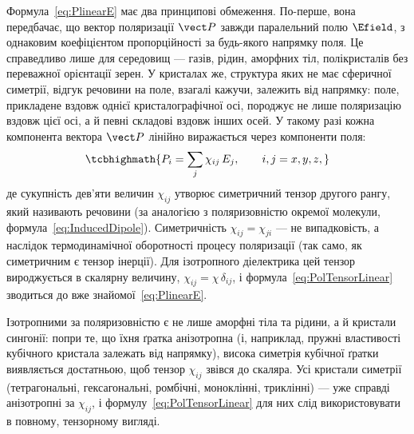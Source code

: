 Формула~\eqref{eq:PlinearE} має два принципові обмеження. По-перше, вона передбачає, що вектор поляризації $\vect P$ завжди паралельний полю
$\Efield$, з однаковим коефіцієнтом пропорційності за будь-якого напрямку поля. Це справедливо лише для  середовищ --- газів,
рідин, аморфних тіл, полікристалів без переважної орієнтації зерен. У кристалах же, структура яких не має сферичної симетрії, відгук речовини на
поле, взагалі кажучи, залежить від напрямку: поле, прикладене вздовж однієї кристалографічної осі, породжує не лише поляризацію вздовж цієї осі, а
й певні складові вздовж інших осей. У такому разі кожна компонента вектора $\vect P$ лінійно виражається через  компоненти поля:
\begin{equation}\label{eq:PolTensorLinear}
	\tcbhighmath{
		P_i = \sum_j \chi_{ij}\, E_j, \qquad i,j = x,y,z,
	}
\end{equation}
де сукупність дев'яти величин $\chi_{ij}$ утворює симетричний тензор другого рангу, який називають  речовини (за
аналогією з поляризовністю окремої молекули, формула~\eqref{eq:InducedDipole}). Симетричність $\chi_{ij}=\chi_{ji}$ --- не випадковість, а наслідок
термодинамічної оборотності процесу поляризації (так само, як симетричним є тензор інерції). Для ізотропного діелектрика цей тензор вироджується в
скалярну величину, $\chi_{ij} = \chi\,\delta_{ij}$, і формула~\eqref{eq:PolTensorLinear} зводиться до вже знайомої~\eqref{eq:PlinearE}.

\begin{Attention}
	Ізотропними за поляризовністю є не лише аморфні тіла та рідини, а й кристали  сингонії: попри те, що їхня ґратка анізотропна (і,
	наприклад, пружні властивості кубічного кристала залежать від напрямку), висока симетрія кубічної ґратки виявляється достатньою, щоб тензор
	$\chi_{ij}$ звівся до скаляра. Усі кристали  симетрії (тетрагональні, гексагональні, ромбічні, моноклінні, триклінні) --- уже
	справді анізотропні за $\chi_{ij}$, і формулу~\eqref{eq:PolTensorLinear} для них слід використовувати в повному, тензорному вигляді.
\end{Attention}

